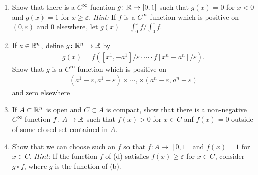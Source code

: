 \begin{problems}
{\begin{enumerate}[label={\upshape(\alph*)}]
                    on $(-1, 1)$ and 0 else 0 elsewhere.
                \item Show that there is a $C^\infty$ fucntion $g\colon{}\mathbb{R}\to [0, 1]$ such that $g(x) = 0$ for $x<0$ and 
                    $g(x) = 1$ for $x\ge \varepsilon$. \textit{Hint:} If $f$ is a $C^\infty$ function which is positive
                    on $(0, \varepsilon)$ and 0 elsewhere, let $g(x) = \int_{0}^{x }{{f}\big/{\int_{0 }^{\varepsilon }{f }}}$.
                \item If $a\in \mathbb{R}^n$, define $g\colon{}\mathbb{R}^n\to \mathbb{R}$ by 
                    \begin{align*}
                        g(x) = f\left(\left[x^1,-a^1\right]/\varepsilon\cdot \cdots \cdot f\left[x^n - a^n\right]/\varepsilon\right).
                    \end{align*} 
                    Show that $g$ is a $C^\infty$ function which is positive on 
                    \begin{align*}
                        \left(a^1-\varepsilon, a^1+\varepsilon\right) \times \cdots, \times\left(a^n-\varepsilon, a^n+\varepsilon\right)
                    \end{align*}
                    and zero elsewhere
                \item If $A\subset \mathbb{R}^n$ is open and $C\subset A$ is compact, show that there is a 
                    non-negative $C^\infty$ function $f\colon{}A\to \mathbb{R}$ such that $f(x)>0$ for $x\in C$ anf $f(x) = 0$
                    outside of some closed set contained in $A$.
                \item Show that we can choose such an $f$ so that $f\colon{}A\to [0, 1]$ and $f(x) = 1$ for $x\in C$. 
                    \textit{Hint:} If the function $f$ of (d) satisfies $f(x)\ge \varepsilon$ for $x\in C$, consider 
                    $g\circ f$, where $g$ is the function of (b).
            \end{enumerate}
        }
\end{problems}